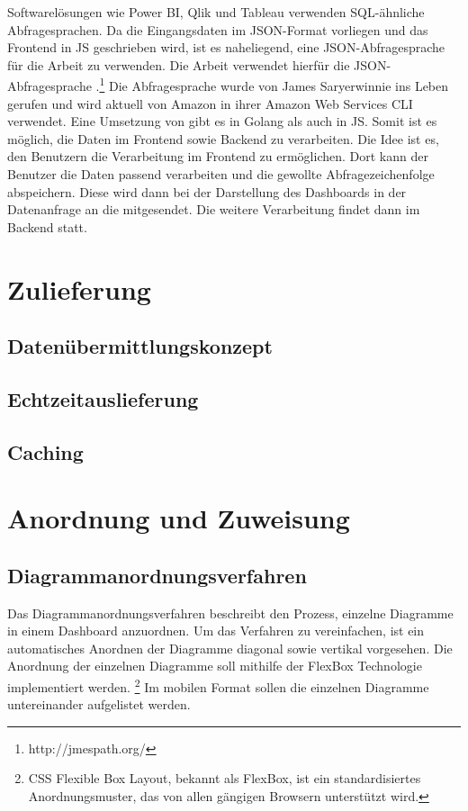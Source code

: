 Softwarelösungen wie Power BI, Qlik und Tableau verwenden SQL-ähnliche Abfragesprachen.
Da die Eingangsdaten im JSON-Format vorliegen und das Frontend in JS geschrieben wird,
ist es naheliegend, eine JSON-Abfragesprache für die Arbeit zu verwenden. Die Arbeit
verwendet hierfür die JSON-Abfragesprache .\footnote{http://jmespath.org/}
Die Abfragesprache wurde von James Saryerwinnie ins Leben gerufen und wird aktuell von
Amazon in ihrer Amazon Web Services CLI verwendet.\cite{AWSJMESPath} Eine Umsetzung von
 gibt es in Golang als auch in JS. Somit ist es möglich, die Daten im
Frontend sowie Backend zu verarbeiten. Die Idee ist es, den Benutzern die Verarbeitung
im Frontend zu ermöglichen. Dort kann der Benutzer die Daten passend verarbeiten und die
gewollte Abfragezeichenfolge abspeichern. Diese wird dann bei der Darstellung des 
Dashboards in der Datenanfrage an die  mitgesendet.
Die weitere Verarbeitung findet dann im Backend statt.

\section{Zulieferung}
\label{sec:zulieferung}

\subsection{Datenübermittlungskonzept}
\label{subsec:datenuebermittlungskonzept}


\subsection{Echtzeitauslieferung}
\label{subsec:echtzeitauslieferung}


\subsection{Caching}
\label{subsec:caching}

\section{Anordnung und Zuweisung}
\label{sec:andordnungundzuweisung}

\subsection{Diagrammanordnungsverfahren}
\label{subsec:diagrammanordnungsverfahren}
Das Diagrammanordnungsverfahren beschreibt den Prozess, einzelne Diagramme in einem Dashboard anzuordnen.
Um das Verfahren zu vereinfachen, ist ein automatisches Anordnen der Diagramme diagonal sowie vertikal vorgesehen.
Die Anordnung der einzelnen Diagramme soll mithilfe der FlexBox Technologie implementiert werden.
\footnote{CSS Flexible Box Layout, bekannt als FlexBox, ist ein standardisiertes Anordnungsmuster, das von allen gängigen Browsern unterstützt wird.\cite{CanIUseFlexBox}}
Im mobilen Format sollen die einzelnen Diagramme untereinander aufgelistet werden. 

